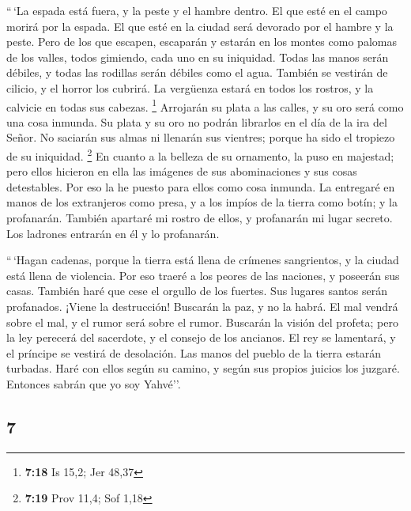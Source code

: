 \begin{paracol}{2}
 ``\,`La espada está fuera, y la peste y el hambre
dentro. El que esté en el campo morirá por la espada. El que esté en la
ciudad será devorado por el hambre y la peste.  Pero de
los que escapen, escaparán y estarán en los montes como palomas de los
valles, todos gimiendo, cada uno en su iniquidad.  Todas
las manos serán débiles, y todas las rodillas serán débiles como el
agua.  También se vestirán de cilicio, y el horror los
cubrirá. La vergüenza estará en todos los rostros, y la calvicie en
todas sus cabezas. \footnote{\textbf{7:18} Is 15,2; Jer 48,37}
 Arrojarán su plata a las calles, y su oro será como una
cosa inmunda. Su plata y su oro no podrán librarlos en el día de la ira
del Señor. No saciarán sus almas ni llenarán sus vientres; porque ha
sido el tropiezo de su iniquidad. \footnote{\textbf{7:19} Prov 11,4; Sof
  1,18}  En cuanto a la belleza de su ornamento, la puso
en majestad; pero ellos hicieron en ella las imágenes de sus
abominaciones y sus cosas detestables. Por eso la he puesto para ellos
como cosa inmunda.  La entregaré en manos de los
extranjeros como presa, y a los impíos de la tierra como botín; y la
profanarán.  También apartaré mi rostro de ellos, y
profanarán mi lugar secreto. Los ladrones entrarán en él y lo
profanarán.

 ``\,`Hagan cadenas, porque la tierra está llena de
crímenes sangrientos, y la ciudad está llena de violencia.
 Por eso traeré a los peores de las naciones, y poseerán
sus casas. También haré que cese el orgullo de los fuertes. Sus lugares
santos serán profanados.  ¡Viene la destrucción! Buscarán
la paz, y no la habrá.  El mal vendrá sobre el mal, y el
rumor será sobre el rumor. Buscarán la visión del profeta; pero la ley
perecerá del sacerdote, y el consejo de los ancianos.  El
rey se lamentará, y el príncipe se vestirá de desolación. Las manos del
pueblo de la tierra estarán turbadas. Haré con ellos según su camino, y
según sus propios juicios los juzgaré. Entonces sabrán que yo soy
Yahvé''.

\switchcolumn
\begin{otherlanguage}{english}

\hypertarget{section-13}{%
\section{7}\label{section-13}}


\end{otherlanguage}
\end{paracol}

